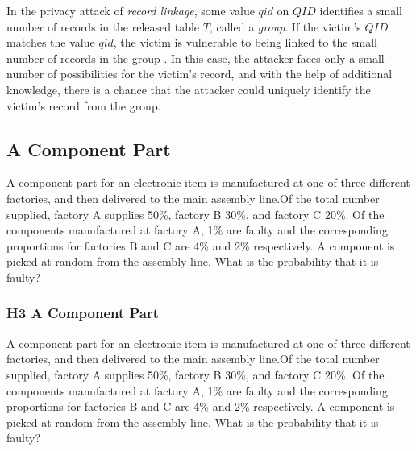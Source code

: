 In the privacy attack of \emph{record linkage}, some value $qid$ on $QID$ identifies a small number of records in the released table $T$,
called a \emph{group}. If the victim's $QID$ matches the value
$qid$, the victim is vulnerable to being linked to the small
number of records in the group \cite{madden2005taq}. In this case, the attacker faces
only a small number of possibilities for the victim's record, and
with the help of additional knowledge, there is a chance that the
attacker could uniquely identify the victim's record from the
group.





\subsection{A Component Part}
A component part for an electronic item is
manufactured at one of three different factories, and then delivered to
the main assembly line.Of the total number supplied, factory A supplies
50\%, factory B 30\%, and factory C 20\%. Of the components
manufactured at factory A, 1\% are faulty and the corresponding
proportions for factories B and C are 4\% and 2\% respectively. A
component is picked at random from the assembly line. What is the
probability that it is faulty? 








\subsubsection{H3 A Component Part }
A component part for an electronic item is
manufactured at one of three \cite{mardia1979ma} different factories, and then delivered to
the main assembly line.Of the total number supplied, factory A supplies
50\%, factory B 30\%, and factory C 20\%. Of the components
manufactured at factory A, 1\% are faulty and the corresponding
proportions for factories B and C are 4\% and 2\% respectively. A
component is picked at random from the assembly line. What is the
probability that it is faulty? 


